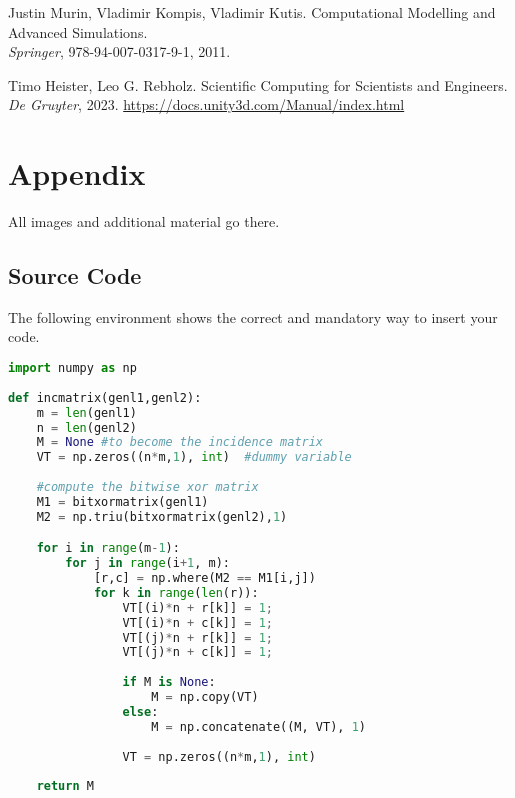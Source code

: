 \documentclass[conference,compsoc]{IEEEtran}
\begin{document}
\begin{thebibliography}{1}
	Justin Murin, Vladimir Kompis, Vladimir Kutis.
	\newblock Computational Modelling and Advanced Simulations. \\
	\newblock \emph{Springer}, 978-94-007-0317-9-1, 2011.
	
	Timo Heister, Leo G. Rebholz.
	\newblock Scientific Computing for Scientists and Engineers.
	\newblock \emph{De Gruyter}, 2023.
	\newblock \href{https://docs.unity3d.com/Manual/index.html}{https://docs.unity3d.com/Manual/index.html}

\end{thebibliography}
\newpage 
\section{Appendix}
All images and additional material go there.

\subsection{Source Code}
\noindent The following environment shows the correct and mandatory way to insert your code.
\begin{lstlisting}[language=Python, caption=Caption example.]
import numpy as np
    
def incmatrix(genl1,genl2):
    m = len(genl1)
    n = len(genl2)
    M = None #to become the incidence matrix
    VT = np.zeros((n*m,1), int)  #dummy variable
    
    #compute the bitwise xor matrix
    M1 = bitxormatrix(genl1)
    M2 = np.triu(bitxormatrix(genl2),1) 

    for i in range(m-1):
        for j in range(i+1, m):
            [r,c] = np.where(M2 == M1[i,j])
            for k in range(len(r)):
                VT[(i)*n + r[k]] = 1;
                VT[(i)*n + c[k]] = 1;
                VT[(j)*n + r[k]] = 1;
                VT[(j)*n + c[k]] = 1;
                
                if M is None:
                    M = np.copy(VT)
                else:
                    M = np.concatenate((M, VT), 1)
                
                VT = np.zeros((n*m,1), int)
    
    return M
\end{lstlisting}
\end{document}
